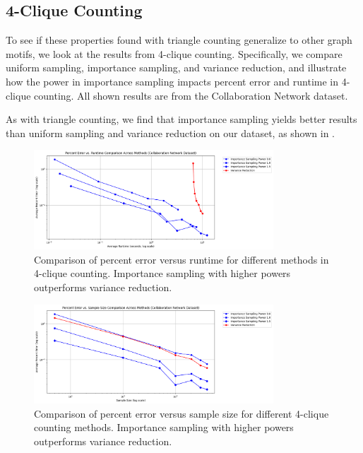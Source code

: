 \documentclass[11pt, margin=1in]{article}
\begin{document}
\subsection{4-Clique Counting}

To see if these properties found with triangle counting generalize to other graph motifs, we look at the results from 4-clique counting.
Specifically, we compare uniform sampling, importance sampling, and variance reduction, and illustrate how the power in importance sampling impacts percent error and runtime in 4-clique counting.
All shown results are from the Collaboration Network dataset.

As with triangle counting, we find that importance sampling yields better results than uniform sampling and variance reduction on our dataset, as shown in .

\begin{figure}[H]
    \centering
    \includegraphics[width=0.8\textwidth]{plots/4-clique/comparison/percent_error_vs_runtime_comparison.png}
    \caption{Comparison of percent error versus runtime for different methods in 4-clique counting. Importance sampling with higher powers outperforms variance reduction.}
    \label{fig:4_clique_percent_error_runtime_comparison}
\end{figure}

\begin{figure}[H]
    \centering
    \includegraphics[width=0.8\textwidth]{plots/4-clique/comparison/percent_error_vs_sample_size_comparison.png}
    \caption{Comparison of percent error versus sample size for different 4-clique counting methods. Importance sampling with higher powers outperforms variance reduction.}
    \label{fig:4_clique_percent_error_sample_size_comparison}
\end{figure}
\end{document}
